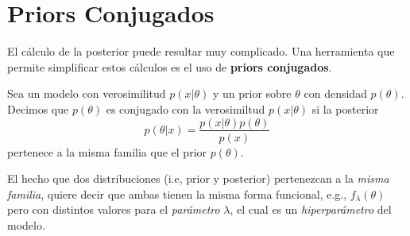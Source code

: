 \section{Priors Conjugados}

El cálculo de la posterior puede resultar muy complicado. Una herramienta que permite simplificar estos cálculos es el uso de \textbf{priors conjugados}.
\begin{definition}

Sea un modelo con verosimilitud $p(x|\theta)$ y un prior sobre $\theta$ con densidad $p(\theta)$. Decimos que $p(\theta)$ es conjugado con la verosimiltud $p(x|\theta)$ si la posterior 
\begin{equation}
	p(\theta|x) = \frac{p(x|\theta)p(\theta)}{p(x)}
\end{equation}
pertenece a la misma familia que el prior $p(\theta)$.
\end{definition}

El hecho que dos  distribuciones (i.e, prior y posterior) pertenezcan a la \textit{misma familia}, quiere decir que ambas tienen la misma forma funcional, e.g., $f_\lambda(\theta)$ pero con distintos valores para el \textit{parámetro} $\lambda$, el cual es un \textit{hiperparámetro} del modelo.

